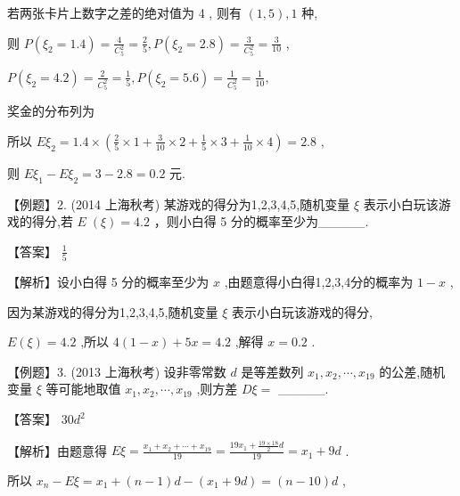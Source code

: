 \documentclass[10pt]{article}
\begin{document}
若两张卡片上数字之差的绝对值为 4 , 则有 \(\left( {1,5}\right) ,1\) 种,

则 \(P\left( {{\xi }_{2} = {1.4}}\right)  = \frac{4}{{C}_{5}^{2}} = \frac{2}{5},P\left( {{\xi }_{2} = {2.8}}\right)  = \frac{3}{{C}_{5}^{2}} = \frac{3}{10}\) ,

\(P\left( {{\xi }_{2} = {4.2}}\right)  = \frac{2}{{C}_{5}^{2}} = \frac{1}{5},P\left( {{\xi }_{2} = {5.6}}\right)  = \frac{1}{{C}_{5}^{2}} = \frac{1}{10},\)

奖金的分布列为

\begin{center}
\end{center}

所以 \(E{\xi }_{2} = {1.4} \times  \left( {\frac{2}{5} \times  1 + \frac{3}{10} \times  2 + \frac{1}{5} \times  3 + \frac{1}{10} \times  4}\right)  = {2.8}\) ,

则 \(E{\xi }_{1} - E{\xi }_{2} = 3 - {2.8} = {0.2}\) 元.

【例题】2. (2014 上海秋考) 某游戏的得分为1,2,3,4,5,随机变量 \(\xi\) 表示小白玩该游戏的得分,若 \(E \; \left( \xi \right)  = {4.2}\) ，则小白得 5 分的概率至少为\_\_\_\_\_.

【答案】 \(\frac{1}{5}\)

【解析】设小白得 5 分的概率至少为 \(x\) ,由题意得小白得1,2,3,4分的概率为 \(1 - x\) ,

因为某游戏的得分为1,2,3,4,5,随机变量 \(\xi\) 表示小白玩该游戏的得分,

\(E\left( \xi \right)  = {4.2}\) ,所以 \(4\left( {1 - x}\right)  + {5x} = {4.2}\) ,解得 \(x = {0.2}\) .

【例题】3. (2013 上海秋考) 设非零常数 \(d\) 是等差数列 \({x}_{1},{x}_{2},\cdots ,{x}_{19}\) 的公差,随机变量 \(\xi\) 等可能地取值 \({x}_{1},{x}_{2},\cdots ,{x}_{19}\) ,则方差 \({D\xi } =\) \_\_\_\_\_.

【答案】 \({30}{d}^{2}\)

【解析】由题意得 \({E\xi } = \frac{{x}_{1} + {x}_{2} + \cdots  + {x}_{19}}{19} = \frac{{19}{x}_{1} + \frac{{19} \times  {18}}{2}d}{19} = {x}_{1} + {9d}\) .

所以 \({x}_{n} - {E\xi } = {x}_{1} + \left( {n - 1}\right) d - \left( {{x}_{1} + {9d}}\right)  = \left( {n - {10}}\right) d\) ,
\end{document}
